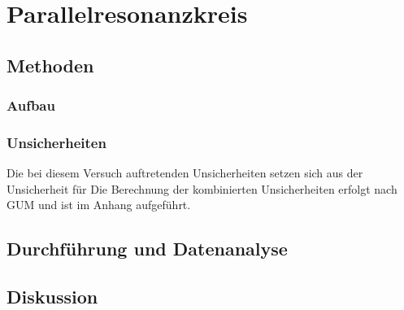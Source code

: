 \section{Parallelresonanzkreis} 

\subsection{Methoden}

\subsubsection{Aufbau}


\subsubsection{Unsicherheiten} 

Die bei diesem Versuch auftretenden Unsicherheiten setzen sich aus der Unsicherheit für %
Die Berechnung der kombinierten Unsicherheiten erfolgt nach GUM und ist im Anhang aufgeführt.

\subsection{Durchführung und Datenanalyse}


\subsection{Diskussion}


